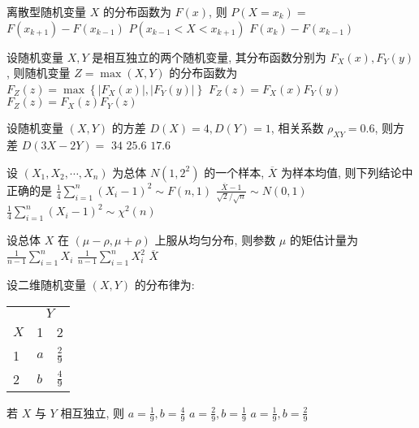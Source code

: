 \begin{ti}
	离散型随机变量 $X$ 的分布函数为 $F(x)$, 则 $P(X=x_k)=$ \kuo{}
	{$F(x_{k+1})-F(x_{k-1})$}
	{$P(x_{k-1}<X<x_{k+1})$}
	{$F(x_{k})-F(x_{k-1})$}
\end{ti}

\begin{ti}
	设随机变量 $X, Y$ 是相互独立的两个随机变量, 其分布函数分别为 $F_X(x), F_Y(y)$, 则随机变量 $Z=\max (X,\allowbreak Y)$ 的分布函数为 \kuo{}
	{$F_Z(z)=\max\left\{\left|F_X(x)\right|,\left|F_Y(y)\right|\right\}$}
	{$F_Z(z)=F_X(x)F_Y(y)$}
	{$F_Z(z)=F_X(z)F_Y(z)$}
\end{ti}

\begin{ti}
	设随机变量 $(X, Y)$ 的方差 $D(X)=4, D(Y)=1$, 相关系数 $\rho_{XY}=0.6$, 则方差 $D(3X-2Y)=$ \kuo{}
	{$34$}
	{$25.6$}
	{$17.6$}
\end{ti}

\begin{ti}
	设 $(X_1,X_2,\cdots,X_n)$ 为总体 $N\left(1,2^2\right)$ 的一个样本, $\overline X$ 为样本均值, 则下列结论中正确的是 \kuo{}
	{$\frac{1}{4}\sum_{i=1}^{n}(X_i-1)^2\sim F(n,1)$}
	{$\frac{\overline{X}-1}{\sqrt{2}/\sqrt{n}}\sim N(0,1)$}
	{$\frac{1}{4}\sum_{i=1}^{n}(X_i-1)^2\sim\chi^2(n)$}
\end{ti}

\begin{ti}
	设总体 $X$ 在 $(\mu-\rho,\mu+\rho)$ 上服从均匀分布, 则参数 $\mu$ 的矩估计量为 \kuo{}
	{$\frac{1}{n-1}\sum_{i=1}^{n}X_i$}
	{$\frac{1}{n-1}\sum_{i=1}^{n}X_i^2$}
	{$\overline{X}$}
\end{ti}

\begin{ti}
	设二维随机变量 $(X,Y)$ 的分布律为:
	\begin{center}
		\begin{tabularx}{0.8\textwidth}{ZZZ}
			\hline
			 & \\
			$X$ & 1 & 2\\
			 & $a$ & $\frac{2}{9}$\\
			 & $b$ & $\frac{4}{9}$\\
			\hline
		\end{tabularx}
	\end{center}
	若 $X$ 与 $Y$ 相互独立, 则 \kuo{}
	{$a=\frac{1}{9}, b=\frac{4}{9}$}
	{$a=\frac{2}{9}, b=\frac{1}{9}$}
	{$a=\frac{1}{9}, b=\frac{2}{9}$}
\end{ti}

